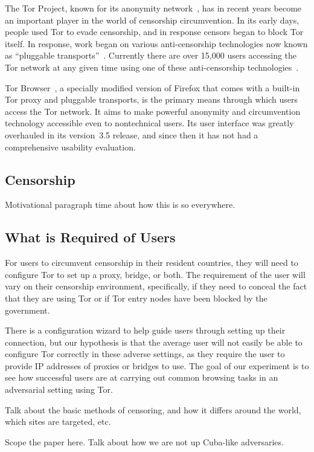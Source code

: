 \documentclass[letterpaper,twocolumn,11pt]{article}
\begin{document}
The Tor Project, known for its anonymity network~\cite{tor-design},
has in recent years become an important player in the world of
censorship circumvention.
In its early days, people used Tor to evade censorship,
and in response censors began to block Tor itself.
In response, work began on various anti-censorship technologies
now known as ``pluggable transports''~\cite{pluggable-transports}.
Currently there are over 15,000 users accessing the Tor network
at any given time using one of these
anti-censorship technologies~\cite{userstats-bridge-country}.

Tor Browser~\cite{tor-browser},
a specially modified version of Firefox that comes
with a built-in Tor proxy and pluggable transports,
is the primary means through which users access the Tor network.
It aims to make powerful anonymity and circumvention technology
accessible even to nontechnical users.
Its user interface was greatly overhauled in its version~3.5 release,
and since then it has not had a comprehensive usability evaluation.

\subsection{Censorship} %
\indent \indent Motivational paragraph time about how this is so everywhere. 

\subsection{What is Required of Users} %
\indent \indent For users to circumvent censorship in their resident countries, they will need to 
configure Tor to set up a proxy, bridge, or both. The requirement of the user will vary on their censorship
environment, specifically, if they need to conceal the fact that they are using Tor or if Tor entry nodes 
have been blocked by the government. 

There is a configuration wizard to help guide users through setting up their connection, but our hypothesis is that the average user will not easily be able to configure Tor correctly in these adverse settings, as they require the user to provide IP addresses of proxies or bridges to use. The goal of our experiment is to see how successful users are at carrying out common browsing tasks in an adversarial setting using Tor.

{\color {red} Talk about the basic methods of censoring, and how it differs 
around the world, which sites are targeted, etc. 

Scope the paper here. Talk about how we are not up Cuba-like adversaries. }
\end{document}
